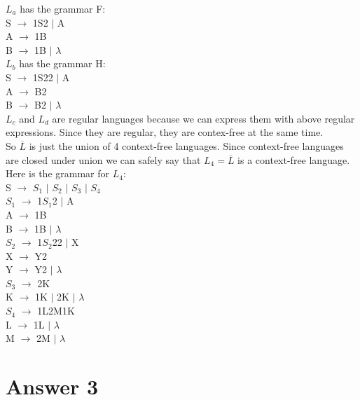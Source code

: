 \documentclass[12pt]{article}
\begin{document}
$L_a$ has the grammar F:\\
S $\rightarrow$ 1S2 $|$ A\\
A $\rightarrow$ 1B\\
B $\rightarrow$ 1B $|$ $\lambda$\\

$L_b$ has the grammar H:\\
S $\rightarrow$ 1S22 $|$ A\\
A $\rightarrow$ B2\\
B $\rightarrow$ B2 $|$ $\lambda$\\

$L_c$ and $L_d$ are regular languages because we can express them with above regular expressions. Since they are regular, they are contex-free at the same time.\\
So $\overline{L}$ is just the union of 4 context-free languages. Since context-free languages are closed under union we can safely say that $L_4 = \overline{L}$ is a context-free language. Here is the grammar for $L_4$:\\
S $\rightarrow$ $S_1$ $|$ $S_2$ $|$ $S_3$ $|$ $S_4$ \\
$S_1$ $\rightarrow$ 1$S_1$2 $|$ A\\
A $\rightarrow$ 1B\\
B $\rightarrow$ 1B $|$ $\lambda$\\
$S_2$ $\rightarrow$ 1$S_2$22 $|$ X\\
X $\rightarrow$ Y2\\
Y $\rightarrow$ Y2 $|$ $\lambda$\\
$S_3$ $\rightarrow$ 2K\\
K $\rightarrow$ 1K $|$ 2K $|$ $\lambda$\\
$S_4$ $\rightarrow$ 1L2M1K\\
L $\rightarrow$ 1L $|$ $\lambda$\\
M $\rightarrow$ 2M $|$ $\lambda$\\








\section*{Answer 3}
\end{document}
